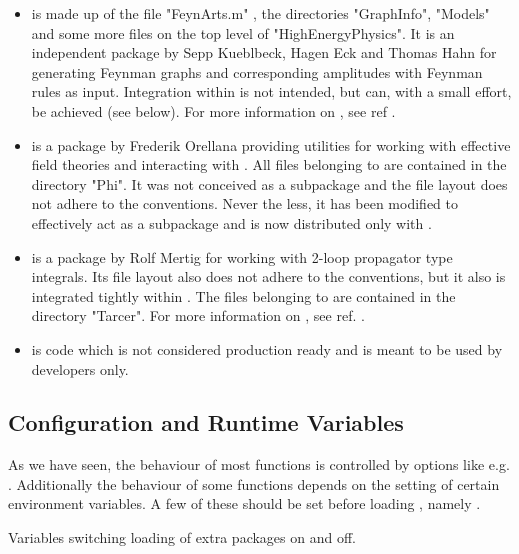 \begin{itemize}

\item{{\bf \fa} is made up of the file "FeynArts.m" , the directories "GraphInfo", "Models" and some more files on the top level of "HighEnergyPhysics". It is an independent package by Sepp Kueblbeck, Hagen Eck and Thomas Hahn for generating Feynman graphs and corresponding amplitudes with Feynman rules as input. Integration within \fc is not intended, but can, with a small effort, be achieved (see \fphi below).
For more information on \fa, see ref .}

\item{{\bf \fphi} is a package by Frederik Orellana providing utilities for working with effective field theories and interacting with \fa. All files belonging to \fphi are contained in the directory "Phi". It was not conceived as a \fc subpackage and the file layout does not adhere to the \fc conventions. Never the less, it has been modified to effectively act as a \fc subpackage and is now distributed only with \fc.}

\item{{\bf \tarcer} is a package by Rolf Mertig for working with 2-loop propagator type integrals. Its file layout also does not adhere to the \fc conventions, but it also is integrated tightly within \fc. The files belonging to \tarcer are contained in the directory "Tarcer". For more information on \tarcer, see ref. .}

\item{{\bf \fcdevel} is code which is not considered production ready and is meant to be used by developers only.}

\end{itemize}

\subsection{Configuration and Runtime Variables}
\label{gamma5}

As we have seen, the behaviour of most functions is controlled by options like e.g. . Additionally the behaviour of some functions depends on the setting of certain environment variables. A few of these should be set before loading \fc, namely .

 {Variables switching loading of extra packages on and off.}

